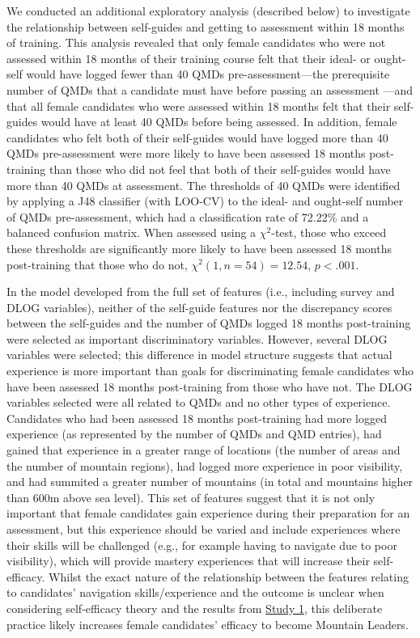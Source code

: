 \documentclass[
  12pt,
  a4paper,
]{book}
\begin{document}
We conducted an additional exploratory analysis (described below) to investigate the relationship between self-guides and getting to assessment within 18 months of training. This analysis revealed that only female candidates who were not assessed within 18 months of their training course felt that their ideal- or ought-self would have logged fewer than 40 QMDs pre-assessment---the prerequisite number of QMDs that a candidate must have before passing an assessment \citep{MTUK2015a}---and that all female candidates who were assessed within 18 months felt that their self-guides would have at least 40 QMDs before being assessed. In addition, female candidates who felt both of their self-guides would have logged more than 40 QMDs pre-assessment were more likely to have been assessed 18 months post-training than those who did not feel that both of their self-guides would have more than 40 QMDs at assessment. The thresholds of 40 QMDs were identified by applying a J48 classifier (with LOO-CV) to the ideal- and ought-self number of QMDs pre-assessment, which had a classification rate of 72.22\% and a balanced confusion matrix. When assessed using a \(\chi^2\)-test, those who exceed these thresholds are significantly more likely to have been assessed 18 months post-training that those who do not, \(\chi^2(1, n = 54) = 12.54\), \(p < .001\).

In the model developed from the full set of features (i.e., including survey and DLOG variables), neither of the self-guide features nor the discrepancy scores between the self-guides and the number of QMDs logged 18 months post-training were selected as important discriminatory variables. However, several DLOG variables were selected; this difference in model structure suggests that actual experience is more important than goals for discriminating female candidates who have been assessed 18 months post-training from those who have not. The DLOG variables selected were all related to QMDs and no other types of experience. Candidates who had been assessed 18 months post-training had more logged experience (as represented by the number of QMDs and QMD entries), had gained that experience in a greater range of locations (the number of areas and the number of mountain regions), had logged more experience in poor visibility, and had summited a greater number of mountains (in total and mountains higher than 600m above sea level). This set of features suggest that it is not only important that female candidates gain experience during their preparation for an assessment, but this experience should be varied and include experiences where their skills will be challenged (e.g., for example having to navigate due to poor visibility), which will provide mastery experiences that will increase their self-efficacy. Whilst the exact nature of the relationship between the features relating to candidates' navigation skills/experience and the outcome is unclear when considering self-efficacy theory and the results from \protect\hyperlink{ml-qualitative}{Study 1}, this deliberate practice likely increases female candidates' efficacy to become Mountain Leaders.
\end{document}
